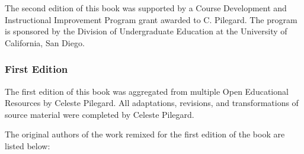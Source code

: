 \documentclass[
]{krantz}
\begin{document}
The second edition of this book was supported by a Course Development and Instructional Improvement Program grant awarded to C. Pilegard. The program is sponsored by the Division of Undergraduate Education at the University of California, San Diego.

\subsubsection*{First Edition}\label{first-edition}


The first edition of this book was aggregated from multiple Open Educational Resources by Celeste Pilegard. All adaptations, revisions, and transformations of source material were completed by Celeste Pilegard.

The original authors of the work remixed for the first edition of the book are listed below:
\end{document}
